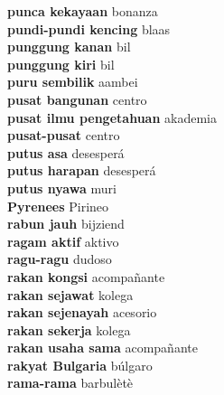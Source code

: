 \textbf{ punca kekayaan  } bonanza \\
\textbf{ pundi-pundi kencing  } blaas \\
\textbf{ punggung kanan  } bil \\
\textbf{ punggung kiri  } bil \\
\textbf{ puru sembilik  } aambei \\
\textbf{ pusat bangunan  } centro \\
\textbf{ pusat ilmu pengetahuan  } akademia \\
\textbf{ pusat-pusat  } centro \\
\textbf{ putus asa  } desesperá \\
\textbf{ putus harapan  } desesperá \\
\textbf{ putus nyawa  } muri \\
\textbf{ Pyrenees  } Pirineo \\
\textbf{ rabun jauh  } bijziend \\
\textbf{ ragam aktif  } aktivo \\
\textbf{ ragu-ragu  } dudoso \\
\textbf{ rakan kongsi  } acompañante \\
\textbf{ rakan sejawat  } kolega \\
\textbf{ rakan sejenayah  } acesorio \\
\textbf{ rakan sekerja  } kolega \\
\textbf{ rakan usaha sama  } acompañante \\
\textbf{ rakyat Bulgaria  } búlgaro \\
\textbf{ rama-rama  } barbulètè \\
